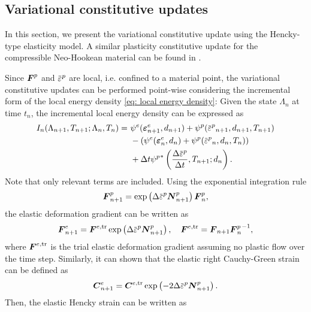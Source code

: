 \subsection{Variational constitutive updates}

In this section, we present the variational constitutive update using the Hencky-type elasticity model. A similar plasticity constitutive update for the compressible Neo-Hookean material can be found in \cite{borden2016phase}.

Since $\boldsymbol{F}^p$ and $\ep$ are local, i.e. confined to a material point, the variational constitutive updates can be performed point-wise considering the incremental form of the local energy density \eqref{eq: local energy density}: Given the state $\Lambda_n$ at time $t_n$, the incremental local energy density can be expressed as
\begin{equation}
  \begin{aligned}
    I_n(\Lambda_{n+1}, T_{n+1}; \Lambda_n, T_n) = & \ \psi^e(\strain^e_{n+1}, d_{n+1}) + \psi^p(\ep_{n+1}, d_{n+1}, T_{n+1})            \\
                                                  & \ - \left( \psi^e(\strain^e_n, d_n) + \psi^p(\ep_n, d_n, T_n) \right)               \\
                                                  & \ + \Delta t {\psi^p}^*\left( \dfrac{\Delta \ep}{\Delta t}, T_{n+1}; d_{n} \right).
  \end{aligned}
\end{equation}
Note that only relevant terms are included. Using the exponential integration rule \cite{weber1990finite}
\begin{align}
  \defgrad^p_{n+1} = \exp\left( \Delta\ep \bfN^p_{n+1} \right) \defgrad^p_n,
\end{align}
the elastic deformation gradient can be written as
\begin{align}
  \defgrad^e_{n+1} = \defgrad^{e,\text{tr}}\exp\left( \Delta\ep \bfN^p_{n+1} \right), \quad \defgrad^{e,\text{tr}} = \defgrad_{n+1} {\defgrad^p_n}^{-1},
\end{align}
where $\boldsymbol{F}^{e,\text{tr}}$ is the trial elastic deformation gradient assuming no plastic flow over the time step. Similarly, it can shown that the elastic right Cauchy-Green strain can be defined as
\begin{align}
  \bfC^e_{n+1} = \bfC^{e,\text{tr}} \exp\left( -2\Delta\ep\bfN^p_{n+1} \right).
\end{align}
Then, the elastic Hencky strain can be written as
